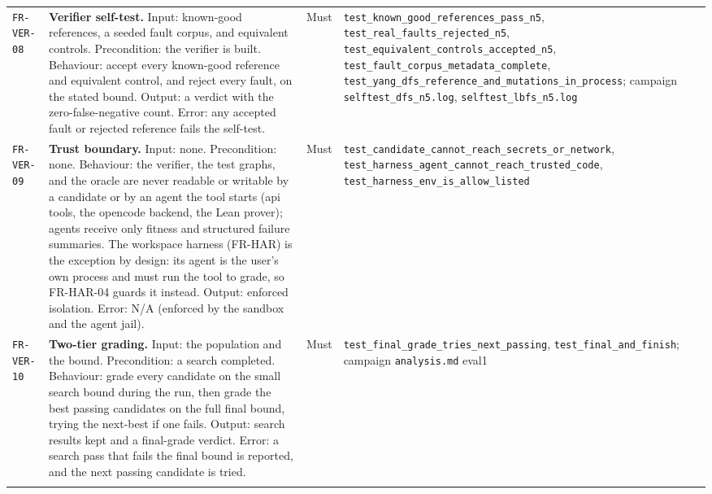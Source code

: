 \begin{longtable}{@{}>{\raggedright\arraybackslash}p{}>{\raggedright\arraybackslash}p{}p{}>{\raggedright\arraybackslash}p{}@{}}
\texttt{FR-VER-08} & \textbf{Verifier self-test.} Input: known-good references,
a seeded fault corpus, and equivalent controls. Precondition: the verifier is
built. Behaviour: accept every known-good reference and equivalent control, and
reject every fault, on the stated bound. Output: a verdict with the
zero-false-negative count. Error: any accepted fault or rejected reference fails
the self-test. & Must & \texttt{test\_known\_good\_references\_pass\_n5},
\texttt{test\_real\_faults\_rejected\_n5},
\texttt{test\_equivalent\_controls\_accepted\_n5},
\texttt{test\_fault\_corpus\_metadata\_complete},
\texttt{test\_yang\_dfs\_reference\_and\_mutations\_in\_process}; campaign
\texttt{selftest\_dfs\_n5.log}, \texttt{selftest\_lbfs\_n5.log} \\
\addlinespace[2pt]

\texttt{FR-VER-09} & \textbf{Trust boundary.} Input: none. Precondition: none.
Behaviour: the verifier, the test graphs, and the oracle are never readable or
writable by a candidate or by an agent the tool starts (api tools, the opencode
backend, the Lean prover); agents receive only fitness and structured failure
summaries. The workspace harness (FR-HAR) is the exception by design: its agent
is the user's own process and must run the tool to grade, so FR-HAR-04 guards
it instead. Output: enforced isolation. Error: N/A (enforced by the sandbox and
the agent jail). & Must & \texttt{test\_candidate\_cannot\_reach\_secrets\_or\_network},
\texttt{test\_harness\_agent\_cannot\_reach\_trusted\_code},
\texttt{test\_harness\_env\_is\_allow\_listed} \\
\addlinespace[2pt]

\texttt{FR-VER-10} & \textbf{Two-tier grading.} Input: the population and the
bound. Precondition: a search completed. Behaviour: grade every candidate on the
small search bound during the run, then grade the best passing candidates on the
full final bound, trying the next-best if one fails. Output: search results kept
and a final-grade verdict. Error: a search pass that fails the final bound is
reported, and the next passing candidate is tried. & Must &
\texttt{test\_final\_grade\_tries\_next\_passing},
\texttt{test\_final\_and\_finish}; campaign \texttt{analysis.md} eval1 \\
\addlinespace[2pt]


\end{longtable}
